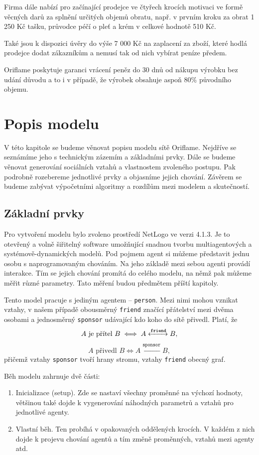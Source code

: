 \documentclass[a4wide,12pt]{report}
\begin{document}
Firma dále nabízí pro začínající prodejce ve čtyřech krocích motivaci ve formě věcných darů za splnění určitých objemů obratu, např. v prvním kroku za obrat 1 250 Kč tašku, průvodce péčí o pleť a krém v celkové hodnotě 510 Kč.

Také jsou k dispozici úvěry do výše 7 000 Kč na zaplacení za zboží, které hodlá prodejce dodat zákazníkům a nemusí tak od nich vybírat peníze předem.

Oriflame poskytuje garanci vrácení peněz do 30 dnů od nákupu výrobku bez udání důvodu a to i v případě, že výrobek obsahuje aspoň 80\% původního objemu.



\chapter{Popis modelu}
V této kapitole se budeme věnovat popisu modelu sítě Oriflame. Nejdříve se seznámíme jeho s technickým zázemím a základními prvky. Dále se budeme věnovat generování sociálních vztahů a vlastnostem zvoleného postupu. Pak podrobně rozebereme jednotlivé prvky a objasníme jejich chování. Závěrem se budeme zabývat výpočetními algoritmy a rozdílům mezi modelem a skutečností.
\section{Základní prvky}
Pro vytvoření modelu bylo zvoleno prostředí NetLogo\cite{netlogo} ve verzi 4.1.3. Je to otevřený a volně šiřitelný software umožňující snadnou tvorbu multiagentových a systémově-dynamických modelů. Pod pojmem agent si můžeme představit jednu osobu s naprogramovaným chováním. Na jeho základě mezi sebou agenti provádí interakce. Tím se jejich chování promítá do celého modelu, na němž pak můžeme měřit různé parametry. Tato měření budou předmětem příští kapitoly.

Tento model pracuje s jediným agentem -- \texttt{person}. Mezi nimi mohou vznikat vztahy, v našem případě obousměrný \texttt{friend} značící přátelství mezi dvěma osobami a jednosměrný \texttt{sponsor} udávající kdo koho do sítě přivedl. Platí, že
\[ A \text{ je přítel } B \iff A \xleftrightarrow{\texttt{friend}} B,\]
\[ A \text{ přivedl } B \iff A \xleftarrow{\texttt{sponsor}} B,\]
přičemž vztahy \texttt{sponsor} tvoří hrany stromu, vztahy \texttt{friend} obecný graf.

Běh modelu zahrnuje dvě části:
\begin{enumerate}
\item Inicializace (setup). Zde se nastaví všechny proměnné na výchozí hodnoty, většinou také dojde k vygenerování náhodných parametrů a vztahů pro jednotlivé agenty.
\item Vlastní běh. Ten probíhá v opakovaných oddělených krocích. V každém z nich dojde k projevu chování agentů a tím změně proměnných, vztahů mezi agenty atd.
\end{enumerate}
\end{document}
